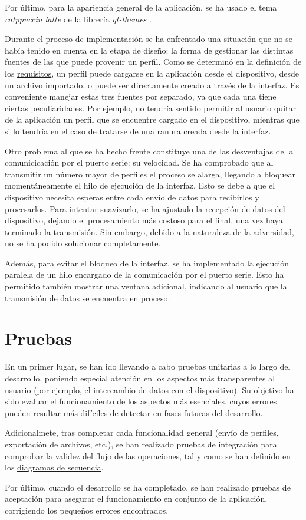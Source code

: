 Por último, para la apariencia general de la aplicación, se ha usado el tema \textit{catppuccin latte} de la librería \textit{qt-themes} \cite{qtthemes-lib}.

Durante el proceso de implementación se ha enfrentado una situación que no se había tenido en cuenta en la etapa de diseño: la forma de gestionar las distintas fuentes de las que puede provenir un perfil. Como se determinó en la definición de los \hyperref[subsub:ui_requisitos]{requisitos}, un perfil puede cargarse en la aplicación desde el dispositivo, desde un archivo importado, o puede ser directamente creado a través de la interfaz. Es conveniente manejar estas tres fuentes por separado, ya que cada una tiene ciertas peculiaridades. Por ejemplo, no tendría sentido permitir al usuario quitar de la aplicación un perfil que se encuentre cargado en el dispositivo, mientras que si lo tendría en el caso de tratarse de una ranura creada desde la interfaz.

Otro problema al que se ha hecho frente constituye una de las desventajas de la comunicicación por el puerto serie: su velocidad. Se ha comprobado que al transmitir un número mayor de perfiles el proceso se alarga, llegando a bloquear momentáneamente el hilo de ejecución de la interfaz. Esto se debe a que el dispositivo necesita esperas entre cada envío de datos para recibirlos y procesarlos. Para intentar suavizarlo, se ha ajustado la recepción de datos del dispositivo, dejando el procesamiento más costoso para el final, una vez haya terminado la transmisión. Sin embargo, debido a la naturaleza de la adversidad, no se ha podido solucionar completamente.

Además, para evitar el bloqueo de la interfaz, se ha implementado la ejecución paralela de un hilo encargado de la comunicación por el puerto serie. Esto ha permitido también mostrar una ventana adicional, indicando al usuario que la transmisión de datos se encuentra en proceso.

\section{Pruebas}

En un primer lugar, se han ido llevando a cabo pruebas unitarias a lo largo del desarrollo, poniendo especial atención en los aspectos más transparentes al usuario (por ejemplo, el intercambio de datos con el dispositivo). Su objetivo ha sido evaluar el funcionamiento de los aspectos más esenciales, cuyos errores pueden resultar más difíciles de detectar en fases futuras del desarrollo.

Adicionalmete, tras completar cada funcionalidad general (envío de perfiles, exportación de archivos, etc.), se han realizado pruebas de integración para comprobar la validez del flujo de las operaciones, tal y como se han definido en los \hyperref[fig:ui_recargar]{diagramas de secuencia}.

Por último, cuando el desarrollo se ha completado, se han realizado pruebas de aceptación para asegurar el funcionamiento en conjunto de la aplicación, corrigiendo los pequeños errores encontrados.
